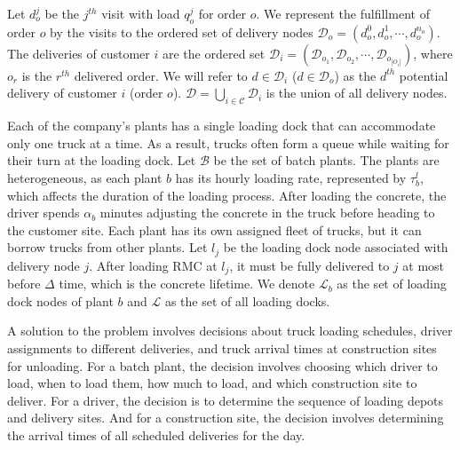 Let $d^j_{o}$ be the $j^{th}$ visit with load $q^j_{o}$ for order $o$. We represent the fulfillment of order $o$ by the visits to the ordered set of delivery nodes $\mathcal{D}_o= \left(d^0_{o},d^1_{o},\cdots, d^{n_o}_{o}\right)$. The deliveries of customer $i$ are the ordered set $\mathcal{D}_i= (\mathcal{D}_{o_1}, \mathcal{D}_{o_2},\cdots,\mathcal{D}_{o_{|O_i|}})$, where $o_r$ is the $r^{th}$ delivered order. We will refer to $d \in \mathcal{D}_i$ ($d \in \mathcal{D}_o$) as the $d^{th}$ potential delivery of customer $i$ (order $o$). $\mathcal{D}=\bigcup_{i\in \mathcal{C}} \mathcal{D}_i$ is the union of all delivery nodes.


Each of the company's plants has a single loading dock that can accommodate only one truck at a time. As a result, trucks often form a queue while waiting for their turn at the loading dock. Let $\mathcal{B}$ be the set of batch plants. The plants are heterogeneous, as each plant $b$ has its hourly loading rate, represented by $\tau^l_b$, which affects the duration of the loading process. After loading the concrete, the driver spends $\alpha_b$ minutes adjusting the concrete in the truck before heading to the customer site. Each plant has its own assigned fleet of trucks, but it can borrow trucks from other plants. Let $l_{j}$ be the loading dock node associated with delivery node $j$. After loading RMC at $l_j$, it must be fully delivered to $j$ at most before $\Delta$ time, which is the concrete lifetime. We denote $\mathcal{L}_b$ as the set of loading dock nodes of plant $b$ and $\mathcal{L}$ as the set of all loading docks.

A solution to the problem involves decisions about truck loading schedules, driver assignments to different deliveries, and truck arrival times at construction sites for unloading. For a batch plant, the decision involves choosing which driver to load, when to load them, how much to load, and which construction site to deliver. For a driver, the decision is to determine the sequence of loading depots and delivery sites. And for a construction site, the decision involves determining the arrival times of all scheduled deliveries for the day.

